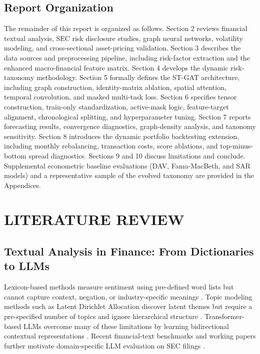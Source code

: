 \documentclass[11pt, a4paper]{article}
\begin{document}
\subsection{Report Organization}
The remainder of this report is organized as follows. Section 2 reviews financial textual analysis, SEC risk disclosure studies, graph neural networks, volatility modeling, and cross-sectional asset-pricing validation. Section 3 describes the data sources and preprocessing pipeline, including risk-factor extraction and the enhanced macro-financial feature matrix. Section 4 develops the dynamic risk-taxonomy methodology. Section 5 formally defines the ST-GAT architecture, including graph construction, identity-matrix ablation, spatial attention, temporal convolution, and masked multi-task loss. Section 6 specifies tensor construction, train-only standardization, active-mask logic, feature-target alignment, chronological splitting, and hyperparameter tuning. Section 7 reports forecasting results, convergence diagnostics, graph-density analysis, and taxonomy sensitivity. Section 8 introduces the dynamic portfolio backtesting extension, including monthly rebalancing, transaction costs, score ablations, and top-minus-bottom spread diagnostics. Sections 9 and 10 discuss limitations and conclude. Supplemental econometric baseline evaluations (DAV, Fama-MacBeth, and SAR models) and a representative sample of the evolved taxonomy are provided in the Appendices.

\section{LITERATURE REVIEW}

\subsection{Textual Analysis in Finance: From Dictionaries to LLMs}
Lexicon-based methods measure sentiment using pre-defined word lists but cannot capture context, negation, or industry-specific meanings \citep{loughran2011liability, li2010textual}. Topic modeling methods such as Latent Dirichlet Allocation discover latent themes but require a pre-specified number of topics and ignore hierarchical structure \citep{blei2003latent, bao2014simultaneously}. Transformer-based LLMs overcome many of these limitations by learning bidirectional contextual representations \citep{devlin2019bert, liu2019roberta, beltagy2020longformer}. Recent financial-text benchmarks and working papers further motivate domain-specific LLM evaluation on SEC filings \citep{choi2026llm, jiang2026finrate}.
\end{document}
